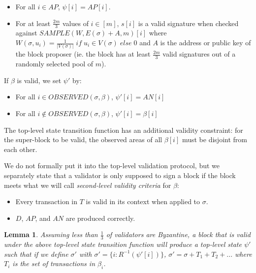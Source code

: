 \documentclass[11pt,a4paper]{report}
\theoremstyle{plain}
\newtheorem{lem}[thm]{Lemma}
\theoremstyle{definition}
\theoremstyle{remark}
\begin{document}
\begin{itemize}
\item
For all $i \in AP$, $\psi[i] = AP[i]$.
\item
For at least $\frac{2m}{3}$ values of $i \in [m]$, $s[i]$ is a valid signature when checked against $SAMPLE(W, E(\sigma) + A, m)[i]$ where $W(\sigma, u_i) = \frac{1}{|V(\sigma)|} \; if \; u_i \in V(\sigma) \; else \; 0$ and $A$ is the address or public key of the block proposer (ie. the block has at least $\frac{2m}{3}$ valid signatures out of a randomly selected pool of $m$).
\end{itemize}

If $\beta$ is valid, we set $\psi'$ by:

\begin{itemize}
\item
For all $i \in OBSERVED(\sigma, \beta)$, $\psi'[i] = AN[i]$
\item
For all $i \notin OBSERVED(\sigma, \beta)$, $\psi'[i] = \beta[i]$
\end{itemize}

The top-level state transition function has an additional validity constraint: for the super-block to be valid, the observed areas of all $\beta[i]$ must be disjoint from each other.

We do not formally put it into the top-level validation protocol, but we separately state that a validator is only supposed to sign a block if the block meets what we will call \emph{second-level validity criteria} for $\beta$:

\begin{itemize}
\item
Every transaction in $T$ is valid in its context when applied to $\sigma$.
\item
$D$, $AP$, and $AN$ are produced correctly.
\end{itemize}

\begin{lem}
Assuming less than $\frac{1}{3}$ of validators are Byzantine, a block that is valid under the above top-level state transition function will produce a top-level state $\psi'$ such that if we define $\sigma'$ with $\sigma' = \{i: R^{-1}(\psi'[i])\}$, $\sigma' = \sigma + T_1 + T_2 + ...$ where $T_i$ is the set of transactions in $\beta_i$.
\end{lem}
\end{document}
